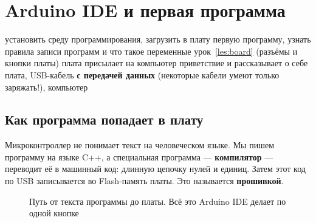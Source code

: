 \section{Arduino IDE и первая программа}
\label{les:ide}
\lessonintro
  {установить среду программирования, загрузить в плату первую программу, узнать правила записи программ и что такое переменные}
  {урок~\ref{les:board} (разъёмы и кнопки платы)}
  {плата присылает на компьютер приветствие и рассказывает о себе}
  {плата, USB-кабель \textbf{с передачей данных} (некоторые кабели умеют только заряжать!), компьютер}

\subsection{Как программа попадает в плату}

Микроконтроллер не понимает текст на человеческом языке. Мы пишем программу на языке C++, а
специальная программа --- \textbf{компилятор} --- переводит её в машинный код: длинную цепочку
нулей и единиц. Затем этот код по USB записывается во Flash-память платы. Это называется
\textbf{прошивкой}.

\begin{figure}[H]
\centering
{}
\caption{Путь от текста программы до платы. Всё это Arduino IDE делает по одной кнопке}
\end{figure}

